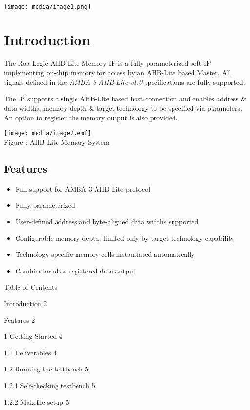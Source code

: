 \texttt{[image: media/image1.png]}

\section{Introduction}\label{introduction}

The Roa Logic AHB-Lite Memory IP is a fully parameterized soft IP
implementing on-chip memory for access by an AHB-Lite based Master. All
signals defined in the \emph{AMBA 3 AHB-Lite v1.0} specifications are
fully supported.

The IP supports a single AHB-Lite based host connection and enables
address \& data widths, memory depth \& target technology to be
specified via parameters. An option to register the memory output is
also provided.

\protect\hypertarget{_Toc346441234}{}{\protect\hypertarget{_Toc347141354}{}{}}\texttt{[image: media/image2.emf]}\\[2\baselineskip]Figure
: AHB-Lite Memory System

\subsection{Features}\label{features}

\begin{itemize}
\item
  Full support for AMBA 3 AHB-Lite protocol
\item
  Fully parameterized
\item
  User-defined address and byte-aligned data widths supported
\item
  Configurable memory depth, limited only by target technology
  capability
\item
  Technology-specific memory cells instantiated automatically
\item
  Combinatorial or registered data output
\end{itemize}

Table of Contents

Introduction 2

Features 2

1 Getting Started 4

1.1 Deliverables 4

1.2 Running the testbench 5

1.2.1 Self-checking testbench 5

1.2.2 Makefile setup 5

